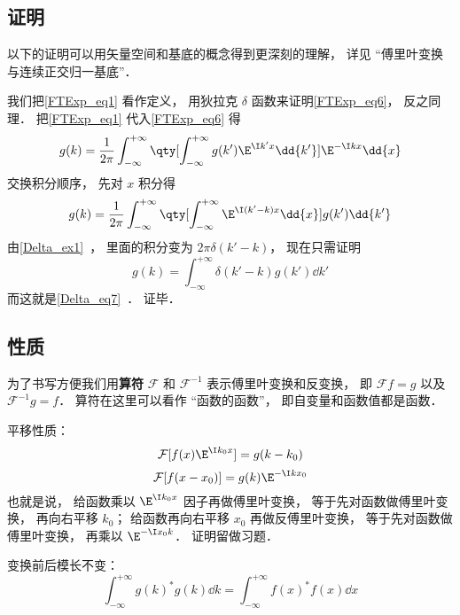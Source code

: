 \subsection{证明}

以下的证明可以用矢量空间和基底的概念得到更深刻的理解， 详见 “傅里叶变换与连续正交归一基底”．

我们把\autoref{FTExp_eq1} 看作定义， 用狄拉克 $\delta$ 函数来证明\autoref{FTExp_eq6}， 反之同理． 把\autoref{FTExp_eq1} 代入\autoref{FTExp_eq6} 得
\begin{equation}
g(k) = \frac{1}{2\pi} \int_{-\infty}^{+\infty} \qty[ \int_{-\infty}^{+\infty} g(k') \E^{\I k' x} \dd{k'}] \E^{-\I k x} \dd{x}
\end{equation}
交换积分顺序， 先对 $x$ 积分得
\begin{equation}
g(k) = \frac{1}{2\pi} \int_{-\infty}^{+\infty} \qty[ \int_{-\infty}^{+\infty}  \E^{\I (k'-k) x} \dd{x}]  g(k')\dd{k'}
\end{equation}
由\autoref{Delta_ex1}~， 里面的积分变为 $2\pi\delta(k'-k)$， 现在只需证明
\begin{equation}
g(k) = \int_{-\infty}^{+\infty} \delta(k'-k)  g(k')\dd{k'}
\end{equation}
而这就是\autoref{Delta_eq7}~． 证毕．

\subsection{性质}
为了书写方便我们用\textbf{算符} $\mathcal F$ 和 $\mathcal F^{-1}$ 表示傅里叶变换和反变换， 即 $\mathcal F f = g$ 以及 $\mathcal F^{-1} g = f$． 算符在这里可以看作 “函数的函数”， 即自变量和函数值都是函数．

平移性质：
\begin{equation}\label{FTExp_eq4}
\mathcal F [f(x) \E^{\I k_0 x}] = g(k - k_0)
\end{equation}
\begin{equation}\label{FTExp_eq7}
\mathcal F[f(x - x_0)] = g(k) \E^{-\I k x_0}
\end{equation}
也就是说， 给函数乘以 $\E^{\I k_0 x}$ 因子再做傅里叶变换， 等于先对函数做傅里叶变换， 再向右平移 $k_0$； 给函数再向右平移 $x_0$ 再做反傅里叶变换， 等于先对函数做傅里叶变换， 再乘以 $\E^{-\I x_0 k}$． 证明留做习题．

变换前后模长不变：
\begin{equation}\label{FTExp_eq2}
\int_{-\infty}^{+\infty} g(k)^* g(k) \dd{k} = \int_{-\infty}^{+\infty} f(x)^* f(x) \dd{x}
\end{equation}

